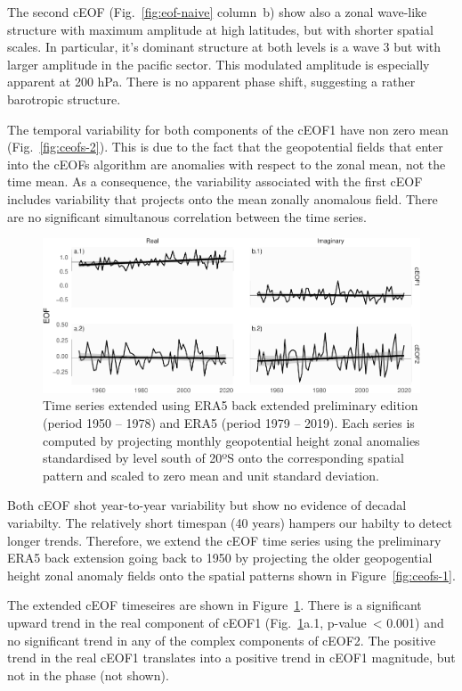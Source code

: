 \documentclass[smallextended]{svjour3}       %
\begin{document}
The second cEOF (Fig.~\ref{fig:eof-naive} column~b) show also a zonal wave-like structure with maximum amplitude at high latitudes, but with shorter spatial scales. In particular, it's dominant structure at both levels is a wave 3 but with larger amplitude in the pacific sector. This modulated amplitude is especially apparent at 200 hPa. There is no apparent phase shift, suggesting a rather barotropic structure.

The temporal variability for both components of the cEOF1 have non zero mean (Fig.~\ref{fig:ceofs-2}). This is due to the fact that the geopotential fields that enter into the cEOFs algorithm are anomalies with respect to the zonal mean, not the time mean. As a consequence, the variability associated with the first cEOF includes variability that projects onto the mean zonally anomalous field. There are no significant simultanous correlation between the time series.



\begin{figure}
\includegraphics{../figures/extended-series-1} \caption{Time series extended using ERA5 back extended preliminary edition (period 1950 -- 1978) and ERA5 (period 1979 -- 2019). Each series is computed by projecting monthly geopotential height zonal anomalies standardised by level south of 20ºS onto the corresponding spatial pattern and scaled to zero mean and unit standard deviation.}\label{fig:extended-series}
\end{figure}

Both cEOF shot year-to-year variability but show no evidence of decadal variabilty. The relatively short timespan (40 years) hampers our habilty to detect longer trends. Therefore, we extend the cEOF time series using the preliminary ERA5 back extension going back to 1950 by projecting the older geopogential height zonal anomaly fields onto the spatial patterns shown in Figure~\ref{fig:ceofs-1}.

The extended cEOF timeseires are shown in Figure~\ref{fig:extended-series}. There is a significant upward trend in the real component of cEOF1 (Fig.~\ref{fig:extended-series}a.1, p-value~\textless{} 0.001) and no significant trend in any of the complex components of cEOF2. The positive trend in the real cEOF1 translates into a positive trend in cEOF1 magnitude, but not in the phase (not shown).
\end{document}
